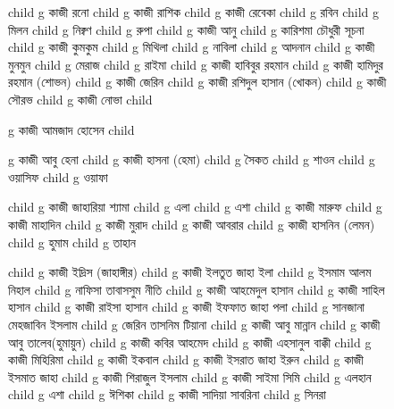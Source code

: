 \documentclass{article}
\begin{document}
\begin{figure}
{\begin{genealogypicture}
{{{{              child{    g{ কাজী রনো  } child{    g{ কাজী রাশিক  }   }   }
              child{    g{ কাজী রেবেকা } 
                  child{    g{ রবিন }   }
                  child{    g{ মিলন }   }
                  child{    g{ নিক্বণ }   }
                  child{    g{ রুপা }   }
              }
              child{    g{ কাজী আনু  } child{    g{ কারিশমা চৌধুরী সূচনা }   }  }
              child{    g{ কাজী কুমকুম  }
                    child{    g{  মিথিলা }   }
                    child{    g{  নাবিলা }   }
                    child{    g{  আদনান }   }
              }
              child{    g{ কাজী মুনমুন }
                  child{    g{  মেরাজ }   }
                  child{    g{  রাইমা }   }
              }
          }
          child{    g{ কাজী হাবিবুর রহমান }  
              child{    g{ কাজী হামিদুর রহমান (শোভন)  }
                  child{ g{ কাজী জেরিন }  }
              }
              child{    g{ কাজী রশিদুল হাসান (খোকন)  }
                  child{ g{ কাজী সৌরভ }  }
                  child{ g{ কাজী নোভা }  }
              }
          }
          child{    g{ কাজী আমজাদ হোসেন } 
          child{    g{ কাজী আবু হেনা }
          child{ g{ কাজী হাসনা (হেমা) } 
              child{ g{ সৈকত  }  }
              child{ g{ শাওন  }  }
              child{ g{ ওয়াসিফ  }  }
              child{ g{ ওয়াফা }  }
          }

            child{ g{ কাজী জাহারিয়া শ্যামা  } 
                child{ g{ এলা  }  }
                child{ g{ এশা  }  }
            }
            child{ g{ কাজী মারুফ  }
                child{ g{ কাজী মাহাদিন }  }
              }
            child{ g{ কাজী মুরাদ }
                child{ g{ কাজী আবরার }  }
              }
            child{ g{ কাজী হাসনিন (লেমন) }
              child{ g{ হুমাম  }  }
              child{ g{ তাহান }  }
            }
          }
          child{    g{ কাজী ইদ্রিস (জাহাঙ্গীর) }
                child{ g{ কাজী ইলতুত জাহা ইলা } 
                      child{ g{ ইসমাম আলম নিহাল  }  }
                      child{ g{ নাফিসা তাবাসসুম নীতি }  }
                 } 
                child{ g{ কাজী আহমেদুল হাসান } 
                    child{ g{ কাজী সাহিল হাসান }  }
                    child{ g{ কাজী রাইসা হাসান }  }
                 }
                 child{ g{ কাজী ইফফাত জাহা পলা }
                      child{ g{ সানজানা মেহজাবিন ইসলাম  }  }
                      child{ g{ জেরিন তাসনিম টিয়ানা }  }
                   }
            }
          child{    g{ কাজী আবু মান্নান }   }
          child{   
            g{ কাজী আবু তালেব(হুমায়ুন)  }
              child{ g{ কাজী কবির আহমেদ  }  }
              child{ g{ কাজী এহসানুল বাক্কী }
                  child{ g{ কাজী মিহিরিমা }  }
              }
          }
          child{    g{ কাজী ইকবাল } 
                child{ g{ কাজী ইসরাত জাহা ইরুন }  }
                child{ g{ কাজী ইসমাত জাহা }  }
            }
          child{    g{ কাজী শিরাজুল ইসলাম }  
              child{ g{ কাজী সাইমা সিমি } 
                  child{ g{ এলহান }  }
                  child{ g{ এশা }  }
                  child{ g{ ঈশিকা }  }
              }
              child{ g{ কাজী সাদিয়া সাবরিনা } 
                    child{ g{ সিনরা }  }
              }
           }
        
}}}}
\end{genealogypicture}}
\end{figure}
\end{document}

